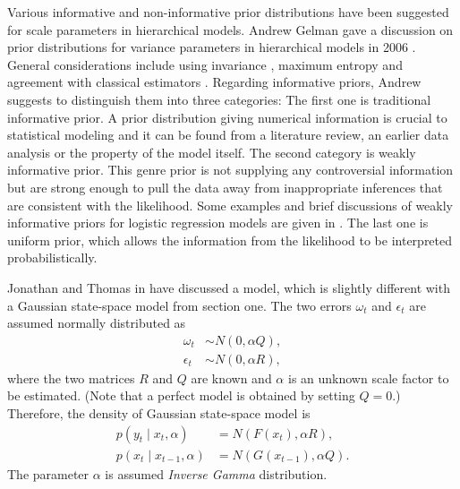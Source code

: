 Various informative and non-informative prior distributions have been suggested for scale parameters in hierarchical models. Andrew Gelman gave a discussion on prior distributions for variance parameters in hierarchical models in 2006 \cite{gelman2006prior}. General considerations include using invariance \cite{jeffries1961theory}, maximum entropy \cite{jaynes1983papers} and agreement with classical estimators \cite{box2011bayesian}.  Regarding informative priors, Andrew suggests to distinguish them into three categories: The first one is traditional informative prior. A prior distribution giving numerical information is crucial to statistical modeling and it can be found from a literature review, an earlier data analysis or the property of the model itself. The second category is weakly informative prior. This genre prior is not supplying any controversial information but are strong enough to pull the data away from inappropriate inferences that are consistent with the likelihood. Some examples and brief discussions of weakly informative priors for logistic regression models are given in \cite{gelman2008weakly}. The last one is uniform prior, which allows the information from the likelihood to be interpreted probabilistically. 

Jonathan and Thomas in \cite{stroud2007sequential} have discussed a model, which is slightly different with a Gaussian state-space model from section one. The two errors $\omega_t$ and $\epsilon_t$ are assumed normally distributed as
\begin{align*}
\omega_t &\sim N(0,\alpha Q),\\
\epsilon_t &\sim N(0,\alpha R),
\end{align*}
where the two matrices $R$ and $Q$ are known and $\alpha$ is an unknown scale factor to be estimated. (Note that a perfect model is obtained by setting $Q= 0$.) Therefore, the density of Gaussian state-space model is
\begin{align*}
p(y_t\mid x_t,\alpha) &= N(F(x_t),\alpha R),\\
p(x_t\mid x_{t-1},\alpha) &= N(G(x_{t-1}),\alpha Q).
\end{align*}
The parameter $\alpha$ is assumed \textit{Inverse Gamma} distribution. 

